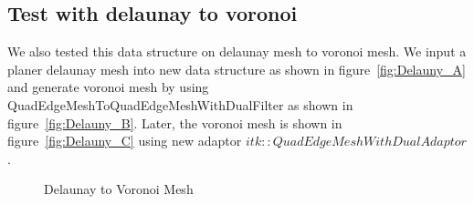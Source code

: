 \documentclass{InsightArticle}
\begin{document}
\subsection{Test with delaunay to voronoi}
We also tested this data structure on delaunay mesh to voronoi mesh. We input a planer delaunay mesh into new data structure as shown in figure~\ref{fig:Delauny_A} and generate voronoi mesh by using QuadEdgeMeshToQuadEdgeMeshWithDualFilter as shown in figure~\ref{fig:Delauny_B}. Later, the voronoi mesh is shown in figure~\ref{fig:Delauny_C} using new adaptor $itk::QuadEdgeMeshWithDualAdaptor$. \\
\begin{figure}[!b]
	\centering
	\caption{Delaunay to Voronoi Mesh}
\label{fig:delaunayToVoronoiMesh}
\end{figure}
\end{document}
